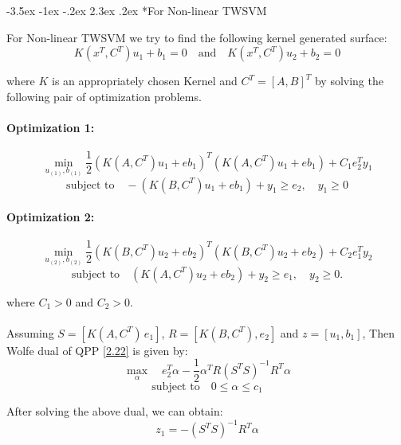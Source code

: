 \documentclass[12pt,a4paper,oneside,english]{report}
\makeatletter
\renewcommand\subsection{\@startsection {subsection}{1}{\z@}%
                                   {-3.5ex \@plus -1ex \@minus -.2ex}%
                                   {2.3ex \@plus.2ex}%
                                   {\centering\normalfont\Large\bfseries}}
\makeatother
\begin{document}
\subsection*{For Non-linear TWSVM}

For Non-linear TWSVM we try to find the following kernel generated surface:
\begin{equation}
    K(x^T, C^T) u_1 + b_1 = 0 \quad \text{and} \quad K(x^T, C^T) u_2 + b_2 = 0
    \label{eq:kernel_surface}
\end{equation}

where \( K \) is an appropriately chosen Kernel and \( C^T = [A, B]^T \) by solving the following pair of optimization problems.

\paragraph{Optimization 1:}
\begin{equation} \label{2.22}
    \min_{u_{(1)}, b_{(1)}} \frac{1}{2} (K(A, C^T) u_1 + e b_1)^T (K(A, C^T) u_1 + e b_1) + C_1 e_2^T y_1
\end{equation}
\[
\text{subject to} \quad -(K(B, C^T) u_1 + e b_1) + y_1 \geq e_2, \quad y_1 \geq 0
\]

\paragraph{Optimization 2:} \label{2.23}
\begin{equation}
    \min_{u_{(2)}, b_{(2)}} \frac{1}{2} (K(B, C^T) u_2 + e b_2)^T (K(B, C^T) u_2 + e b_2) + C_2 e_1^T y_2
\end{equation}
\[
\text{subject to} \quad (K(A, C^T) u_2 + e b_2) + y_2 \geq e_1, \quad y_2 \geq 0.
\]

\noindent
where \( C_1 > 0 \) and \( C_2 > 0 \).
\\
\\

Assuming \( S = [K(A, C^T) \, e_1] \), \( R = [K(B, C^T), e_2] \) and \( z = [u_1, b_1] \),  
Then Wolfe dual of QPP \eqref{2.22} is given by:
\begin{equation}
    \max_{\alpha} \quad e_2^T \alpha - \frac{1}{2} \alpha^T R (S^T S)^{-1} R^T \alpha
\end{equation}
\[
\text{subject to} \quad 0 \leq \alpha \leq c_1
\]

After solving the above dual, we can obtain:
\begin{equation} \label{2.25}
    z_1 = -(S^T S)^{-1} R^T \alpha
\end{equation}
\end{document}
